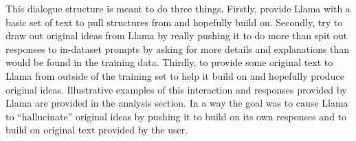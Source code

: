 This dialogue structure is meant to do three things. Firstly, provide Llama with
a basic set of text to pull structures from and hopefully build on. Secondly,
try to draw out original ideas from Llama by really pushing it to do more than 
spit out responses to in-dataset prompts by asking for more details and
explanations than would be found in the training data. Thirdly, to provide some
original text to Llama from outside of the training set to help it build on and
hopefully produce original ideas. Illustrative examples of this interaction and
responses provided by Llama are provided in the analysis section. In a way the
goal was to cause Llama to ``hallucinate'' original ideas by pushing it to build
on its own responses and to build on original text provided by the user.
